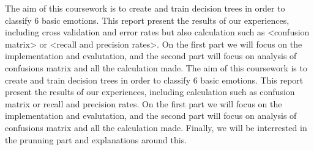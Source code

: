 The aim of this coursework is to create and train decision trees in order to classify 6 basic emotions.
This report present the results of our experiences, including cross validation and error rates but also
calculation such as <confusion matrix> or <recall and precision rates>. 
On the first part we will focus on the implementation and evalutation,
and the second part will focus on analysis of confusions matrix and all the calculation made. 
The aim of this coursework is to create and train decision trees in order to classify 6 basic emotions.
This report present the results of our experiences, including calculation such as confusion matrix or
recall and precision rates. 
On the first part we will focus on the implementation and evalutation, and the second part will focus on
analysis of confusions matrix and all the calculation made. 
Finally, we will be interrested in the prunning part and explanations around this.
